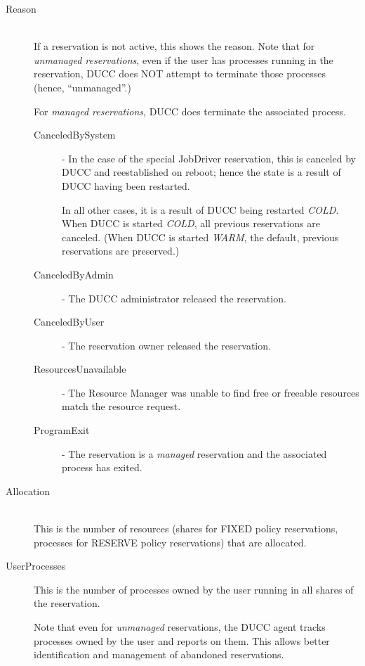 \begin{description}
\item[Reason] \hfill \\


  If a reservation is not active, this shows the reason.  Note that for
  {\em unmanaged reservations}, even if the user has processes running in the
  reservation, DUCC does NOT attempt to terminate those processes (hence, ``unmanaged''.)

  For {\em managed reservations}, DUCC does terminate the associated process.

  \begin{description}
  \item[CanceledBySystem] - In the case of the special JobDriver reservation, this is
    canceled by DUCC and reestablished on reboot; hence the state is a result of DUCC
    having been restarted.

    In all other cases, it is a result of DUCC being restarted {\em COLD}.  When
    DUCC is started {\em COLD}, all previous reservations are canceled.  (When DUCC
    is started {\em WARM}, the default, previous reservations are preserved.)
  \item[CanceledByAdmin] - The DUCC administrator released the reservation. 
  \item[CanceledByUser] - The reservation owner released the reservation. 
  \item[ResourcesUnavailable] - The Resource Manager was unable to find free or freeable resources 
    match the resource request. 
  \item[ProgramExit] - The reservation is a {\em managed} reservation and the associated
    process has exited.
  \end{description}

\item[Allocation] \hfill \\
  This is the number of resources (shares for FIXED policy reservations, processes for
  RESERVE policy reservations) that are allocated.

\item[UserProcesses] This is the number of processes owned by the user running in all
  shares of the reservation.  
  
  Note that even for {\em unmanaged} reservations, the DUCC agent tracks processes owned
  by the user and reports on them.  This allows better identification and management of
  abandoned reservations.


\end{description}
